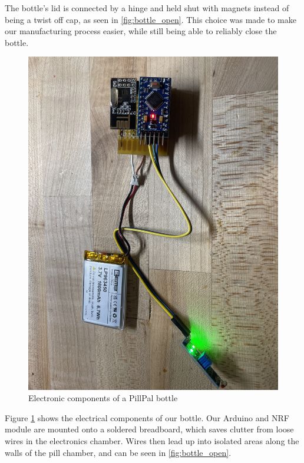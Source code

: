 \documentclass[sigconf]{acmart}
\begin{document}
The bottle's lid is connected by a hinge and held shut with magnets instead of being a twist off cap, as seen in \ref{fig:bottle_open}. This choice was made to make our manufacturing process easier, while still being able to reliably close the bottle.

\begin{figure}[h]
  \centering
  \includegraphics[width=\linewidth]{images/electronics.jpg}
  \caption{Electronic components of a PillPal bottle}
  \label{fig:electronics}
\end{figure}

Figure \ref{fig:electronics} shows the electrical components of our bottle. Our Arduino and NRF module are mounted onto a soldered breadboard, which saves clutter from loose wires in the electronics chamber. Wires then lead up into isolated areas along the walls of the pill chamber, and can be seen in \ref{fig:bottle_open}.
\end{document}
